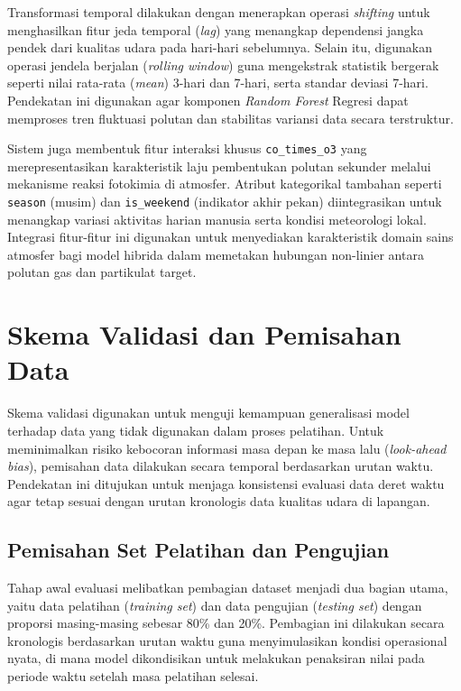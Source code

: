 Transformasi temporal dilakukan dengan menerapkan operasi \textit{shifting} untuk menghasilkan fitur jeda temporal (\textit{lag}) yang menangkap dependensi jangka pendek dari kualitas udara pada hari-hari sebelumnya. Selain itu, digunakan operasi jendela berjalan (\textit{rolling window}) guna mengekstrak statistik bergerak seperti nilai rata-rata (\textit{mean}) 3-hari dan 7-hari, serta standar deviasi 7-hari. Pendekatan ini digunakan agar komponen \textit{Random Forest} Regresi dapat memproses tren fluktuasi polutan dan stabilitas variansi data secara terstruktur.

Sistem juga membentuk fitur interaksi khusus \texttt{co\_times\_o3} yang merepresentasikan karakteristik laju pembentukan polutan sekunder melalui mekanisme reaksi fotokimia di atmosfer. Atribut kategorikal tambahan seperti \texttt{season} (musim) dan \texttt{is\_weekend} (indikator akhir pekan) diintegrasikan untuk menangkap variasi aktivitas harian manusia serta kondisi meteorologi lokal. Integrasi fitur-fitur ini digunakan untuk menyediakan karakteristik domain sains atmosfer bagi model hibrida dalam memetakan hubungan non-linier antara polutan gas dan partikulat target.

\section{Skema Validasi dan Pemisahan Data}

Skema validasi digunakan untuk menguji kemampuan generalisasi model terhadap data yang tidak digunakan dalam proses pelatihan. Untuk meminimalkan risiko kebocoran informasi masa depan ke masa lalu (\textit{look-ahead bias}), pemisahan data dilakukan secara temporal berdasarkan urutan waktu. Pendekatan ini ditujukan untuk menjaga konsistensi evaluasi data deret waktu agar tetap sesuai dengan urutan kronologis data kualitas udara di lapangan.

\subsection{Pemisahan Set Pelatihan dan Pengujian}

Tahap awal evaluasi melibatkan pembagian dataset menjadi dua bagian utama, yaitu data pelatihan (\textit{training set}) dan data pengujian (\textit{testing set}) dengan proporsi masing-masing sebesar 80\% dan 20\%. Pembagian ini dilakukan secara kronologis berdasarkan urutan waktu guna menyimulasikan kondisi operasional nyata, di mana model dikondisikan untuk melakukan penaksiran nilai pada periode waktu setelah masa pelatihan selesai.


